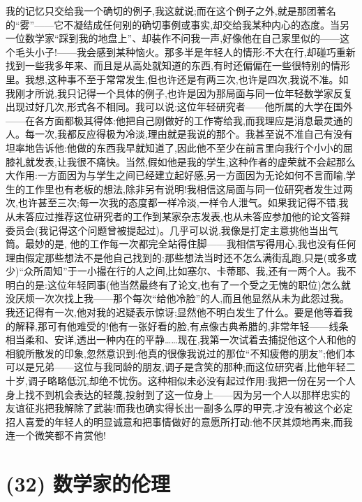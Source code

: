 我的记忆只交给我一个确切的例子,我这就说;而在这个例子之外,就是那团著名的“雾”——它不凝结成任何别的确切事例或事实,却交给我某种内心的态度。当另一位数学家“踩到我的地盘上”、却装作不问我一声,好像他在自己家里似的——这个毛头小子!——我会感到某种恼火。那多半是年轻人的情形:不大在行,却碰巧重新找到一些我多年来、而且是从高处就知道的东西,有时还偏偏在一些很特别的情形里。我想,这种事不至于常常发生,但也许还是有两三次,也许是四次,我说不准。如我刚才所说,我只记得一个具体的例子,也许是因为那局面与同一位年轻数学家反复出现过好几次,形式各不相同。我可以说:这位年轻研究者——他所属的大学在国外——在各方面都极其得体:他把自己刚做好的工作寄给我,而我理应是消息最灵通的人。每一次,我都反应得极为冷淡,理由就是我说的那个。我甚至说不准自己有没有坦率地告诉他:他做的东西我早就知道了,因此他不至少在前言里向我行个小小的屈膝礼就发表,让我很不痛快。当然,假如他是我的学生,这种作者的虚荣就不会起那么大作用:一方面因为与学生之间已经建立起好感,另一方面因为无论如何不言而喻,学生的工作里也有老板的想法,除非另有说明!我相信这局面与同一位研究者发生过两次,也许甚至三次;每一次我的态度都一样冷淡,一样令人泄气。如果我记得不错,我从未答应过推荐这位研究者的工作到某家杂志发表,也从未答应参加他的论文答辩委员会(我记得这个问题曾被提起过)。几乎可以说,我像是打定主意挑他当出气筒。最妙的是,
%
 他的工作每一次都完全站得住脚——我相信写得用心,我也没有任何理由假定那些想法不是他自己找到的:那些想法当时还不怎么满街乱跑,只是(或多或少)“众所周知”于一小撮在行的人之间,比如塞尔、卡蒂耶、我,还有一两个人。我不明白的是:这位年轻同事(他当然最终有了论文,也有了一个受之无愧的职位)怎么就没厌烦一次次找上我——那个每次“给他冷脸”的人,而且他显然从未为此怨过我。我还记得有一次,他对我的迟疑表示惊讶;显然他不明白发生了什么。要是他等着我的解释,那可有他难受的!他有一张好看的脸,有点像古典希腊的,非常年轻——线条相当柔和、安详,透出一种内在的平静……现在,我第一次试着去捕捉他这个人和他的相貌所散发的印象,忽然意识到:他真的很像我说过的那位“不知疲倦的朋友”;他们本可以是兄弟——这位与我同龄的朋友,调子是含笑的那种;而这位研究者,比他年轻二十岁,调子略略低沉,却绝不忧伤。这种相似未必没有起过作用:我把一份在另一个人身上找不到机会表达的轻蔑,投射到了这一位身上——因为另一个人以那样忠实的友谊征兆把我解除了武装!而我也确实得长出一副多么厚的甲壳,才没有被这个必定招人喜爱的年轻人的明显诚意和把事情做好的意愿所打动:他不厌其烦地再来,而我连一个微笑都不肯赏他!

\section{(32) 数学家的伦理}

